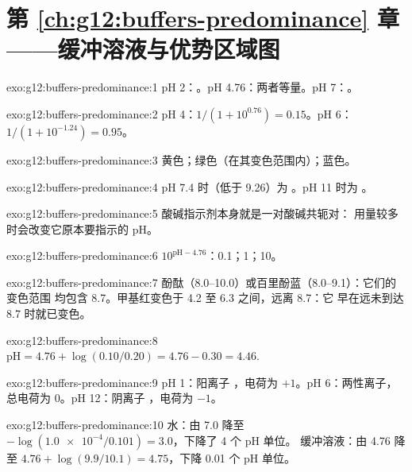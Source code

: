 \section*{第 \ref{ch:g12:buffers-predominance} 章——缓冲溶液与优势区域图}

\begin{solution}{exo:g12:buffers-predominance:1}
pH 2：。pH 4.76：两者等量。pH 7：。
\end{solution}

\begin{solution}{exo:g12:buffers-predominance:2}
pH 4：$1/(1 + 10^{0.76}) = 0.15$。pH 6：$1/(1 + 10^{-1.24}) = 0.95$。
\end{solution}

\begin{solution}{exo:g12:buffers-predominance:3}
黄色；绿色（在其变色范围内）；蓝色。
\end{solution}

\begin{solution}{exo:g12:buffers-predominance:4}
pH 7.4 时（低于 9.26）为 。pH 11 时为 。
\end{solution}

\begin{solution}{exo:g12:buffers-predominance:5}
酸碱指示剂本身就是一对酸碱共轭对：
用量较多时会改变它原本要指示的 pH。
\end{solution}

\begin{solution}{exo:g12:buffers-predominance:6}
$10^{\mathrm{pH} - 4.76}$：0.1；1；10。
\end{solution}

\begin{solution}{exo:g12:buffers-predominance:7}
酚酞（8.0--10.0）或百里酚蓝（8.0--9.1）：它们的变色范围
均包含 8.7。甲基红变色于 4.2 至 6.3 之间，远离 8.7：它
早在远未到达 8.7 时就已变色。
\end{solution}

\begin{solution}{exo:g12:buffers-predominance:8}
$\mathrm{pH} = 4.76 + \log(0.10/0.20) = 4.76 - 0.30 = 4.46$.
\end{solution}

\begin{solution}{exo:g12:buffers-predominance:9}
pH 1：阳离子 ，电荷为 $+1$。pH 6：两性离子，
总电荷为 0。pH 12：阴离子 ，电荷为 $-1$。
\end{solution}

\begin{solution}{exo:g12:buffers-predominance:10}
水：由 7.0 降至 $-\log(\num{1.0e-4}/0.101) = 3.0$，下降了 4 个 pH 单位。
缓冲溶液：由 4.76 降至 $4.76 + \log(9.9/10.1) = 4.75$，下降 0.01 个 pH 单位。
\end{solution}

